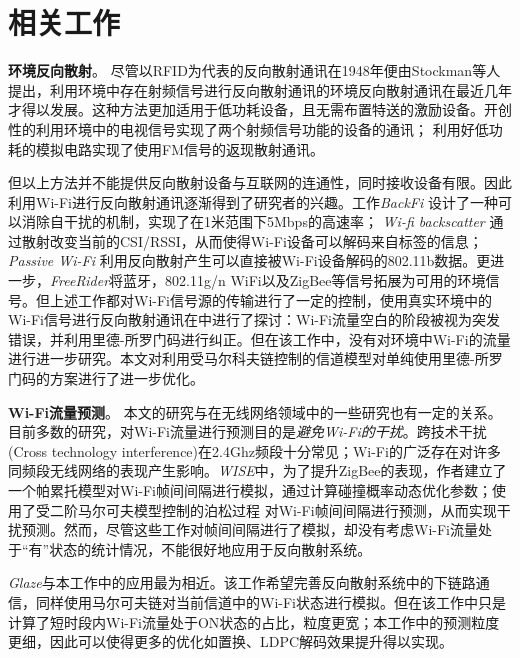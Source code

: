 
\chapter{相关工作}
\label{chap:related}

\textbf{环境反向散射}。
尽管以RFID为代表的反向散射通讯在1948年便由Stockman等人提出\cite{}，利用环境中存在射频信号进行反向散射通讯的环境反向散射通讯在最近几年才得以发展。这种方法更加适用于低功耗设备，且无需布置特送的激励设备。\cite{}开创性的利用环境中的电视信号实现了两个射频信号功能的设备的通讯；
\cite{}%
利用好低功耗的模拟电路实现了使用FM信号的返现散射通讯。

但以上方法并不能提供反向散射设备与互联网的连通性，同时接收设备有限。因此利用Wi-Fi进行反向散射通讯逐渐得到了研究者的兴趣。工作\textit{BackFi}
\cite{} %
设计了一种可以消除自干扰的机制，实现了在1米范围下5Mbps的高速率；
\textit{Wi-fi backscatter}\cite{}%
通过散射改变当前的CSI/RSSI，从而使得Wi-Fi设备可以解码来自标签的信息；
\textit{Passive Wi-Fi}\cite{}%
利用反向散射产生可以直接被Wi-Fi设备解码的802.11b数据。更进一步，\textit{FreeRider}将蓝牙，802.11g/n WiFi以及ZigBee等信号拓展为可用的环境信号。但上述工作都对Wi-Fi信号源的传输进行了一定的控制，使用真实环境中的Wi-Fi信号进行反向散射通讯在\cite{}中进行了探讨：Wi-Fi流量空白的阶段被视为突发错误，并利用里德-所罗门码进行纠正。但在该工作中，没有对环境中Wi-Fi的流量进行进一步研究。本文对利用受马尔科夫链控制的信道模型对单纯使用里德-所罗门码的方案进行了进一步优化。

\textbf{Wi-Fi流量预测}。
本文的研究与在无线网络领域中的一些研究也有一定的关系。目前多数的研究，对Wi-Fi流量进行预测目的是\emph{避免Wi-Fi的干扰}。跨技术干扰(Cross technology interference)在2.4Ghz频段十分常见；Wi-Fi的广泛存在对许多同频段无线网络的表现产生影响。\textit{WISE}\cite{}中，为了提升ZigBee的表现，作者建立了一个帕累托模型对Wi-Fi帧间间隔进行模拟，通过计算碰撞概率动态优化参数；\cite{}使用了受二阶马尔可夫模型控制的泊松过程
对Wi-Fi帧间间隔进行预测，从而实现干扰预测。然而，尽管这些工作对帧间间隔进行了模拟，却没有考虑Wi-Fi流量处于“有”状态的统计情况，不能很好地应用于反向散射系统。

\textit{Glaze}\cite{}与本工作中的应用最为相近。该工作希望完善反向散射系统中的下链路通信，同样使用马尔可夫链对当前信道中的Wi-Fi状态进行模拟。但在该工作中只是计算了短时段内Wi-Fi流量处于ON状态的占比，粒度更宽；本工作中的预测粒度更细，因此可以使得更多的优化如置换、LDPC解码效果提升得以实现。
